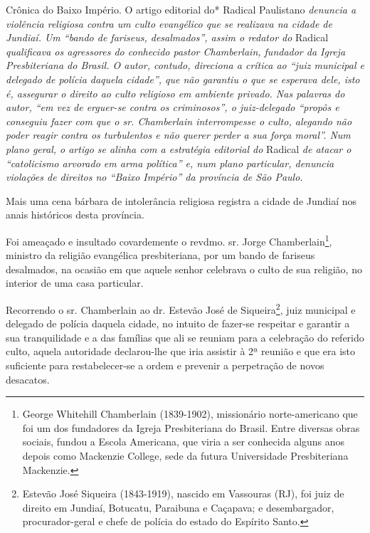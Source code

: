 \begin{didascalia}
Crônica do Baixo Império. O artigo editorial do* Radical Paulistano
\emph{denuncia a violência religiosa contra um culto evangélico que se
realizava na cidade de Jundiaí. Um ``bando de fariseus, desalmados'',
assim o redator do} Radical \emph{qualificava os agressores do conhecido
pastor Chamberlain, fundador da Igreja Presbiteriana do Brasil. O autor,
contudo, direciona a crítica ao ``juiz municipal e delegado de polícia
daquela cidade'', que não garantiu o que se esperava dele, isto é,
assegurar o direito ao culto religioso em ambiente privado. Nas palavras
do autor, ``em vez de erguer-se contra os criminosos'', o juiz-delegado
``propôs e conseguiu fazer com que o sr. Chamberlain interrompesse o
culto, alegando não poder reagir contra os turbulentos e não querer
perder a sua força moral''. Num plano geral, o artigo se alinha com a
estratégia editorial do} Radical \emph{de atacar o ``catolicismo arvorado
em arma política'' e, num plano particular, denuncia violações de
direitos no ``Baixo Império'' da província de São Paulo.}
\end{didascalia}

\asterisc{}

Mais uma cena bárbara de intolerância religiosa registra a cidade de
Jundiaí nos anais históricos desta província.

Foi ameaçado e insultado covardemente o revdmo. sr. Jorge
Chamberlain\footnote{George Whitehill Chamberlain (1839-1902),
  missionário norte-americano que foi um dos fundadores da Igreja
  Presbiteriana do Brasil. Entre diversas obras sociais, fundou a Escola
  Americana, que viria a ser conhecida alguns anos depois como Mackenzie
  College, sede da futura Universidade Presbiteriana Mackenzie.},
ministro da religião evangélica presbiteriana, por um bando de fariseus
desalmados, na ocasião em que aquele senhor celebrava o culto de sua
religião, no interior de uma casa particular.

Recorrendo o sr. Chamberlain ao dr. Estevão José de Siqueira\footnote{
  Estevão José Siqueira (1843-1919), nascido em Vassouras (RJ), foi juiz
  de direito em Jundiaí, Botucatu, Paraibuna e Caçapava; e
  desembargador, procurador-geral e chefe de polícia do estado do
  Espírito Santo.}, juiz municipal e delegado de polícia daquela cidade,
no intuito de fazer-se respeitar e garantir a sua tranquilidade e a das
famílias que ali se reuniam para a celebração do referido culto, aquela
autoridade declarou-lhe que iria assistir à 2ª reunião e que era isto
suficiente para restabelecer-se a ordem e prevenir a perpetração de
novos desacatos.

